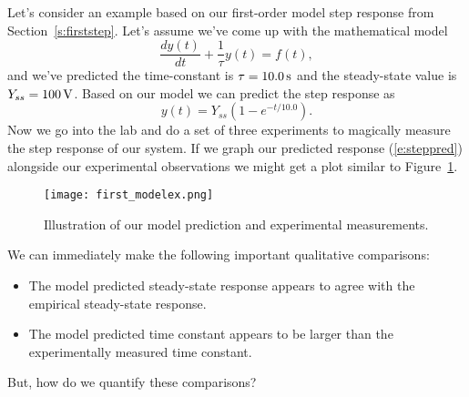 Let's consider an example based on our first-order model step response from Section~\ref{s:firststep}.  Let's assume we've come up with the mathematical model
\begin{equation}
\frac{dy(t)}{dt} + \frac{1}{\tau}y(t) = f(t),
\end{equation}
and we've predicted the time-constant is $\tau=\unit[10.0]{s}$ and the steady-state value is $Y_{ss}=\unit[100]{V}$.  Based on our model we can predict the step response as 
\begin{equation}\label{e:steppred}
y(t) = Y_{ss}\left(1-e^{-t/10.0}\right).
\end{equation}
Now we go into the lab and do a set of three experiments to magically measure the step response of our system.  If we graph our predicted response (\ref{e:steppred}) alongside our experimental observations we might get a plot similar to Figure~\ref{f:firstmodelex}.
\renewcommand{\ThisFigWidth}{0.4}
\begin{figure}[th!]
\centering
\texttt{[image: first\_modelex.png]}
\caption{Illustration of our model prediction and experimental measurements.}
\label{f:firstmodelex}
\end{figure}
We can immediately make the following important qualitative comparisons:
\begin{itemize}
\item The model predicted steady-state response appears to agree with the empirical steady-state response.
\item The model predicted time constant appears to be larger than the experimentally measured time constant.
\end{itemize}
But, how do we quantify these comparisons?

